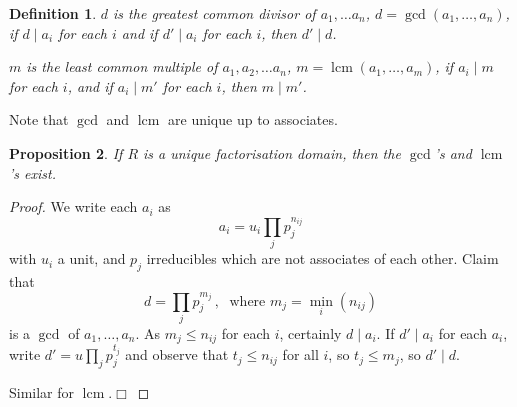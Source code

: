 \documentclass{article}
\theoremstyle{plain}\theoremheaderfont{\normalfont\itshape}\theorembodyfont{\rmfamily}\theoremseparator{.}\newtheorem*{rem}{Remark}\newtheorem*{ex}{Example}\newtheorem*{proof}{Proof}\newtheorem*{altp}{Alternative proof}\newtheorem*{nonex}{Non-Example}
\theoremstyle{plain}\theoremheaderfont{\normalfont\bfseries}\theorembodyfont{\rmfamily}\theoremseparator{.}\newtheorem{thm}{Theorem}[section]\newtheorem{lem}[thm]{Lemma}\newtheorem{prop}[thm]{Proposition}\newtheorem*{cor}{Corollary}\newtheorem{defn}[thm]{Definition}\newtheorem{clm}[thm]{Claim}\newtheorem{clminproof}{Claim}\newtheorem*{notn}{Notation}\newtheorem*{exer}{Exercise}\newtheorem*{lemnn}{Lemma}
\theoremstyle{break}\theoremheaderfont{\normalfont\itshape}\theorembodyfont{\rmfamily}\theoremseparator{.\medskip}\newtheorem*{proofskip}{Proof}\newtheorem*{exs}{Examples}\newtheorem*{rems}{Remarks}\newtheorem*{obs}{Observations}
\theoremstyle{break}\theoremheaderfont{\normalfont\bfseries}\theorembodyfont{\rmfamily}\theoremseparator{.\medskip}\newtheorem{lemskip}[thm]{Lemma}\newtheorem{defnskip}[thm]{Definition}\newtheorem{propskip}[thm]{Proposition}\newtheorem{thmskip}[thm]{Theorem}
\numberwithin{equation}{section}
\newcommand{\qed}{\hfill\ensuremath{\Box}}
\DeclareMathOperator{\lcm}{lcm}
\begin{document}
    \begin{defn}
        \(d\) is the \textit{greatest common divisor} of \(a_1,\dots a_n\), \(d=\gcd(a_1,\dots,a_n)\), if \(d\mid a_i\) for each \(i\) and if \(d'\mid a_i\) for each \(i\), then \(d'\mid d\).

        \(m\) is the \textit{least common multiple} of \(a_1,a_2,\dots a_n\), \(m=\lcm(a_1,\dots,a_m)\), if \(a_i\mid m\) for each \(i\), and if \(a_i\mid m'\) for each \(i\), then \(m\mid m'\).
    \end{defn}

    Note that \(\gcd\) and \(\lcm\) are unique up to associates.

    \begin{prop}
        If \(R\) is a unique factorisation domain, then the \(\gcd\)'s and \(\lcm\)'s exist.
    \end{prop}
    \begin{proof}
        We write each \(a_i\) as
        \[a_i=u_i\prod_{j}p_j^{n_{ij}}\]
        with \(u_i\) a unit, and \(p_j\) irreducibles which are not associates of each other. Claim that
        \[d=\prod_{j}p_j^{m_j}\,,\;\text{ where }m_j=\min_{i}(n_{ij})\]
        is a \(\gcd\) of \(a_1,\dots,a_n\). As \(m_j\le n_{ij}\) for each \(i\), certainly \(d\mid a_i\). If \(d'\mid a_i\) for each \(a_i\), write \(d'=u\prod_{j}p_j^{t_j}\) and observe that \(t_j\le n_{ij}\) for all \(i\), so \(t_j\le m_j\), so \(d'\mid d\).

        Similar for \(\lcm\).\qed
    \end{proof}
\end{document}
